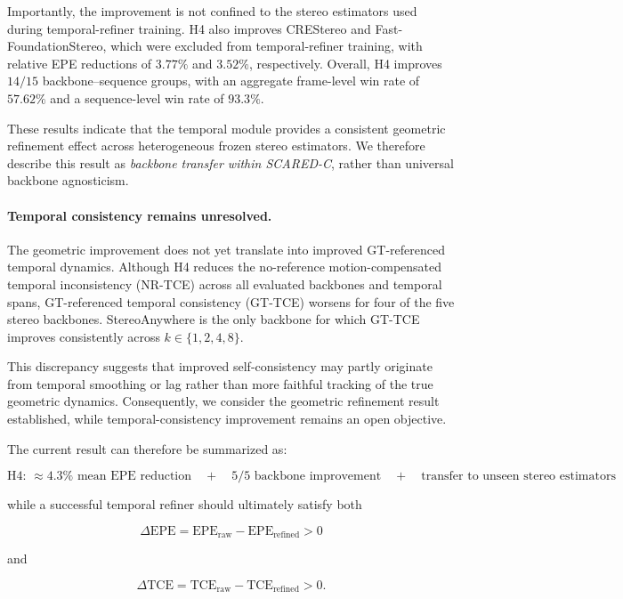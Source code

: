 \documentclass[11pt,a4paper]{article}
\begin{document}
Importantly, the improvement is not confined to the stereo estimators
used during temporal-refiner training. H4 also improves CREStereo and
Fast-FoundationStereo, which were excluded from temporal-refiner
training, with relative EPE reductions of \(3.77\%\) and \(3.52\%\),
respectively. Overall, H4 improves \(14/15\) backbone--sequence groups,
with an aggregate frame-level win rate of \(57.62\%\) and a
sequence-level win rate of \(93.3\%\).

These results indicate that the temporal module provides a consistent
geometric refinement effect across heterogeneous frozen stereo
estimators. We therefore describe this result as \emph{backbone
transfer within SCARED-C}, rather than universal backbone agnosticism.

\paragraph{Temporal consistency remains unresolved.}
The geometric improvement does not yet translate into improved
GT-referenced temporal dynamics. Although H4 reduces the no-reference
motion-compensated temporal inconsistency (NR-TCE) across all evaluated
backbones and temporal spans, GT-referenced temporal consistency
(GT-TCE) worsens for four of the five stereo backbones. StereoAnywhere
is the only backbone for which GT-TCE improves consistently across
\(k\in\{1,2,4,8\}\).

This discrepancy suggests that improved self-consistency may partly
originate from temporal smoothing or lag rather than more faithful
tracking of the true geometric dynamics. Consequently, we consider the
geometric refinement result established, while temporal-consistency
improvement remains an open objective.

The current result can therefore be summarized as:

\[
\boxed{
\text{H4: } \approx 4.3\% \text{ mean EPE reduction}
\quad+\quad
5/5 \text{ backbone improvement}
\quad+\quad
\text{transfer to unseen stereo estimators}
}
\]

while a successful temporal refiner should ultimately satisfy both

\[
\Delta \mathrm{EPE}
=
\mathrm{EPE}_{\mathrm{raw}}
-
\mathrm{EPE}_{\mathrm{refined}}
>0
\]

and

\[
\Delta \mathrm{TCE}
=
\mathrm{TCE}_{\mathrm{raw}}
-
\mathrm{TCE}_{\mathrm{refined}}
>0.
\]
\end{document}
